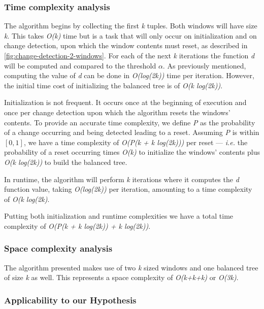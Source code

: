 \subsubsection*{Time complexity analysis}
The algorithm begins by collecting the first \textit{k} tuples. Both windows will have size \textit{k}. This takes \textit{O(k)} time but is a task that will only occur on initialization and on change detection, upon which the window contents must reset, as described in \ref{fig:change-detection-2-windows}. For each of the next \textit{k} iterations the function \textit{d} will be computed and compared to the threshold $\alpha$. As previously mentioned, computing the value of \textit{d} can be done in \textit{O(log(2k))} time per iteration. However, the initial time cost of initializing the balanced tree is of \textit{O(k log(2k))}. 

Initialization is not frequent. It occurs once at the beginning of execution and once per change detection upon which the algorithm resets the windows' contents. To provide an accurate time complexity, we define \textit{P} as the probability of a change occurring and being detected leading to a reset. Assuming \textit{P} is within $[0, 1]$, we have a time complexity of \textit{O(P(k + k log(2k)))} per reset --- \textit{i.e.} the probability of a reset occurring times \textit{O(k)} to initialize the windows' contents plus \textit{O(k log(2k))} to build the balanced tree.

In runtime, the algorithm will perform \textit{k} iterations where it computes the \textit{d} function value, taking \textit{O(log(2k))} per iteration, amounting to a time complexity of \textit{O(k log(2k)}.

Putting both initialization and runtime complexities we have a total time complexity of \textit{O(P(k + k log(2k)) + k log(2k))}.

\subsubsection*{Space complexity analysis}

The algorithm presented makes use of two \textit{k} sized windows and one balanced tree of size \textit{k} as well. This represents a space complexity of \textit{O(k+k+k)} or \textit{O(3k)}.

\subsubsection*{Applicability to our Hypothesis}

